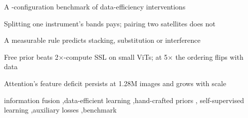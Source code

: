 \documentclass[a4paper,fleqn]{cas-dc}
\newif\ifsubmissionmode
\begin{document}
\ifsubmissionmode\else
\begin{highlights}
\item A \computeCells-configuration benchmark of data-efficiency interventions
\item Splitting one instrument's bands pays; pairing two satellites does not
\item A measurable rule predicts stacking, substitution or interference
\item Free prior beats 2$\times$-compute SSL on small ViTs; at 5$\times$ the ordering flips with data
\item Attention's feature deficit persists at 1.28M images and grows with scale
\end{highlights}
\fi

\begin{keywords}
information fusion \sep data-efficient learning \sep hand-crafted priors \sep
self-supervised learning \sep auxiliary losses \sep benchmark
\end{keywords}

\maketitle
\sloppy  %
\end{document}
